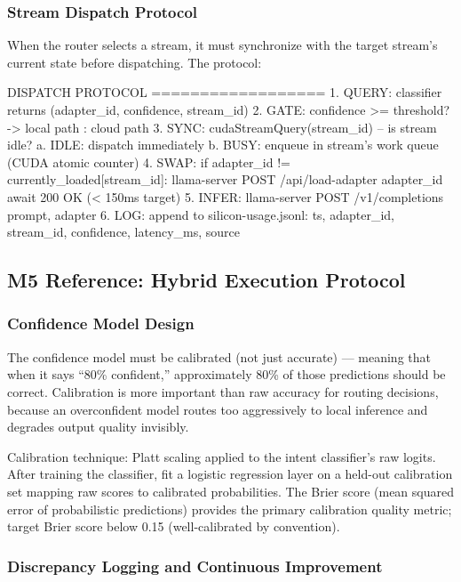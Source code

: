 \documentclass[11pt,letterpaper]{article}
\begin{document}
\subsubsection{Stream Dispatch Protocol}

When the router selects a stream, it must synchronize with the target stream's current state before dispatching. The protocol:

\begin{asciibox}
DISPATCH PROTOCOL
==================
1. QUERY: classifier returns (adapter_id, confidence, stream_id)
2. GATE:  confidence >= threshold? -> local path : cloud path
3. SYNC:  cudaStreamQuery(stream_id) -- is stream idle?
   a. IDLE: dispatch immediately
   b. BUSY: enqueue in stream's work queue (CUDA atomic counter)
4. SWAP:  if adapter_id != currently_loaded[stream_id]:
            llama-server POST /api/load-adapter {adapter_id}
            await 200 OK (< 150ms target)
5. INFER: llama-server POST /v1/completions {prompt, adapter}
6. LOG:   append to silicon-usage.jsonl:
            {ts, adapter_id, stream_id, confidence, latency_ms, source}
\end{asciibox}

\subsection{M5 Reference: Hybrid Execution Protocol}

\subsubsection{Confidence Model Design}

The confidence model must be calibrated (not just accurate) --- meaning that when it says ``80\% confident,'' approximately 80\% of those predictions should be correct. Calibration is more important than raw accuracy for routing decisions, because an overconfident model routes too aggressively to local inference and degrades output quality invisibly.

Calibration technique: Platt scaling applied to the intent classifier's raw logits. After training the classifier, fit a logistic regression layer on a held-out calibration set mapping raw scores to calibrated probabilities. The Brier score (mean squared error of probabilistic predictions) provides the primary calibration quality metric; target Brier score below 0.15 (well-calibrated by convention).

\subsubsection{Discrepancy Logging and Continuous Improvement}
\end{document}

